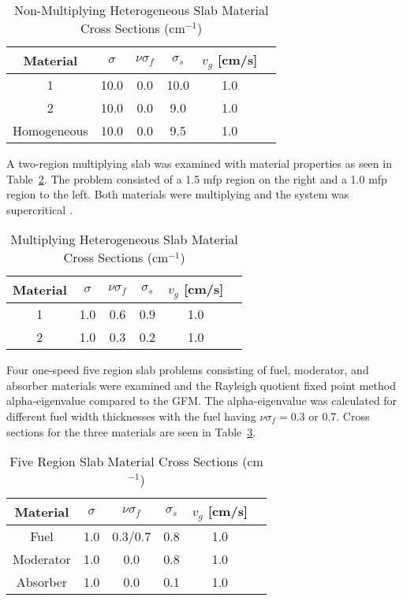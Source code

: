 \begin{table}[H]
    \centering
    \caption{Non-Multiplying Heterogeneous Slab Material Cross Sections (cm$^{-1}$)}
\label{table:BetzlerHetero}
    \begin{tabular}{*6c}
        \toprule
	Material & $\sigma$ & $\nu \sigma_{f}$ & $\sigma_{s}$ & $v_{g}$ [cm/s] \\ 
        \midrule
	1 & 10.0 & 0.0 & 10.0 & 1.0 \\
	2 & 10.0 & 0.0 & 9.0 & 1.0 \\
	Homogeneous & 10.0 & 0.0 & 9.5 & 1.0 \\
        \bottomrule
    \end{tabular}
\end{table}

A two-region multiplying slab was examined with material properties as seen in Table~\ref{table:BetzlerHeteroMult}. The problem consisted of a 1.5 mfp region on the right and a 1.0 mfp region to the left. Both materials were multiplying and the system was supercritical \cite{kornreich_greens_1997}.

\begin{table}[H]
    \centering
    \caption{Multiplying Heterogeneous Slab Material Cross Sections (cm$^{-1}$)}
\label{table:BetzlerHeteroMult}
    \begin{tabular}{*6c}
        \toprule
	Material & $\sigma$ & $\nu \sigma_{f}$ & $\sigma_{s}$ & $v_{g}$ [cm/s] \\ 
        \midrule
	1 & 1.0 & 0.6 & 0.9 & 1.0 \\
	2 & 1.0 & 0.3 & 0.2 & 1.0 \\ 
        \bottomrule
    \end{tabular}
\end{table}

Four one-speed five region slab problems consisting of fuel, moderator, and absorber materials were examined and the Rayleigh quotient fixed point method alpha-eigenvalue compared to the GFM. The alpha-eigenvalue was calculated for different fuel width thicknesses with the fuel having $\nu \sigma_{f} = 0.3$ or 0.7. Cross sections for the three materials are seen in Table~\ref{table:BetzlerFive}.

\begin{table}[H]
    \centering
    \caption{Five Region Slab Material Cross Sections (cm$^{-1}$)}
\label{table:BetzlerFive}
    \begin{tabular}{*6c}
        \toprule
	Material & $\sigma$ & $\nu \sigma_{f}$ & $\sigma_{s}$ & $v_{g}$ [cm/s] \\ 
        \midrule
	Fuel & 1.0 & 0.3/0.7 & 0.8 & 1.0 \\
	Moderator & 1.0 & 0.0 & 0.8 & 1.0 \\ 
	Absorber & 1.0 & 0.0 & 0.1 & 1.0 \\ 
        \bottomrule
    \end{tabular}
\end{table}

